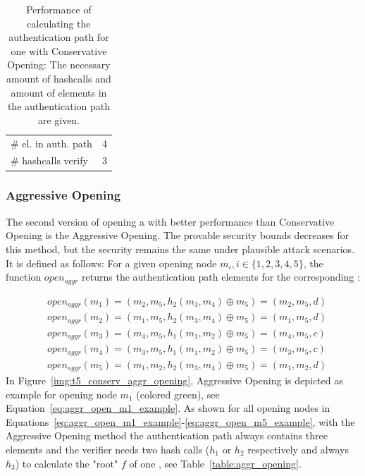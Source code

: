 \begin{table}
\centering
\begin{tabular}{l c} 
 \hline\noalign{\smallskip}
 \multicolumn{2}{c}{\textbf{Conservative Opening}} \\
 \hline\noalign{\smallskip}
 \# el. in auth. path & 4 \\
  \# hashcalls verify & 3 \\
 \hline
\end{tabular}
\caption{Performance of calculating the authentication path for one \tfblock with Conservative Opening: The necessary amount of hashcalls and amount of elements in the authentication path are given.}
\label{table:conserv_opening}
\end{table}

\subsubsection{Aggressive Opening}
\label{sec:aggr_opening}
The second version of opening a \tfblock with better performance than Conservative Opening is the Aggressive Opening. The provable security bounds decreases for this method, but the security remains the same under plausible attack scenarios. It is defined as follows: For a given opening node $m_i, i \in \{1,2,3,4,5\}$, the function $open_{aggr}$ returns the authentication path elements for the corresponding \tfblock:

\begin{align}
&open_{aggr}(m_1) = (m_2, m_5, h_2(m_3,m_4) \oplus m_5) = (m_2, m_5, d) \label{eq:aggr_open_m1_example} \\
&open_{aggr}(m_2) = (m_1, m_5, h_2(m_3,m_4) \oplus m_5) = (m_1, m_5, d) \\
&open_{aggr}(m_3) = (m_4, m_5, h_1(m_1, m_2) \oplus m_5) = (m_4, m_5, c) \\ 
&open_{aggr}(m_4) = (m_3, m_5, h_1(m_1, m_2) \oplus m_5) = (m_3, m_5, c) \\ 
&open_{aggr}(m_5) = (m_1, m_2, h_2(m_3, m_4) \oplus m_5) = (m_1, m_2, d) \label{eq:aggr_open_m5_example}
\end{align}
In Figure~\ref{img:t5_conserv_aggr_opening}, Aggressive Opening is depicted as example for opening node $m_1$ (colored green), see Equation~\ref{eq:aggr_open_m1_example}. 
As shown for all opening nodes in Equations~\ref{eq:aggr_open_m1_example}-\ref{eq:aggr_open_m5_example}, with the Aggressive Opening method the authentication path always contains three elements and the verifier needs two hash calls ($h_1$ or $h_2$ respectively and always $h_3$) to calculate the "root" $f$ of one \tfblock, see Table~\ref{table:aggr_opening}.

